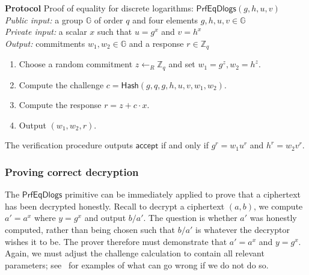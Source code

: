 \documentclass[12pt,a4paper]{article}
\makeatletter
\theoremstyle{definition}
\newcounter{protocol}
\newenvironment{protocol}[1]
  {\par\addvspace{\topsep}
   \noindent
   \tabularx{\linewidth}{@{} X @{}}
    \refstepcounter{protocol}\textbf{Protocol \theprotocol} #1 \\
    \hline}
  {
    \endtabularx
   }
\makeatother
\begin{document}
\begin{protocol}{Proof of equality for discrete logarithms: $\mathsf{PrfEqDlogs}(g, h, u, v)$}\label{prot:ProofEqDlog}
    \textit{Public input:} a group $\mathbb{G}$ of order $q$ and four elements $g, h, u, v\in\mathbb{G}$\\
    \textit{Private input:} a scalar $x$ such that $u = g^x$ and $v = h^x$\\
    \textit{Output:} commitments $w_1, w_2\in\mathbb{G}$ and a response $r\in\mathbb{Z}_q$
    \begin{enumerate}
        \item Choose a random commitment $z\leftarrow_R\mathbb{Z}_q$ and set $w_1 = g^z, w_2=h^z$.
        \item Compute the challenge $c=\mathsf{Hash}(g, q, g, h, u, v, w_1, w_2)$.
        \item Compute the response $r=z+c\cdot x$.
        \item Output $(w_1, w_2, r)$.
    \end{enumerate}
\end{protocol}
The verification procedure outputs $\mathsf{accept}$ if and only if $g^r=w_1u^r$ and $h^r=w_2v^r$.
\subsubsection{Proving correct decryption}
The $\mathsf{PrfEqDlogs}$ primitive can be immediately applied to prove that a ciphertext has been decrypted honestly. Recall to decrypt a ciphertext $(a, b)$, we compute $a' = a^x$ where $y=g^x$ and output $b/a'$. The question is whether $a'$ was honestly computed, rather than being chosen such that $b/a'$ is whatever the decryptor wishes it to be. The prover therefore must demonstrate that $a'=a^x$ and $y=g^x$. Again, we must adjust the challenge calculation to contain all relevant parameters; see~\cite{mcmurtry2020test} for examples of what can go wrong if we do not do so.
\end{document}
